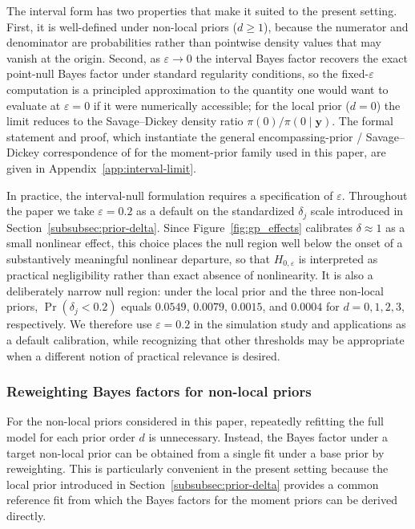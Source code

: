 \documentclass{article}
\begin{document}
The interval form has two properties that make it suited to the
present setting.
First, it is well-defined under non-local priors ($d\ge 1$),
because the numerator and denominator are probabilities rather
than pointwise density values that may vanish at the origin.
Second, as $\varepsilon\to 0$ the interval Bayes factor recovers
the exact point-null Bayes factor under standard regularity
conditions, so the fixed-$\varepsilon$ computation is a principled
approximation to the quantity one would want to evaluate at
$\varepsilon=0$ if it were numerically accessible; for the local
prior ($d=0$) the limit reduces to the Savage--Dickey density
ratio $\pi(0)/\pi(0\mid\mathbf{y})$.
The formal statement and proof, which instantiate the general
encompassing-prior / Savage--Dickey correspondence of
\textcite{wetzels2010encompassing} for the moment-prior family used
in this paper, are given in Appendix~\ref{app:interval-limit}.

In practice, the interval-null formulation requires a specification of $\varepsilon$. 
Throughout the paper we take $\varepsilon=0.2$ as a default on the standardized $\delta_j$ 
scale introduced in Section~\ref{subsubsec:prior-delta}. Since Figure~\ref{fig:gp_effects} 
calibrates $\delta \approx 1$ as a small nonlinear effect, this choice places the null 
region well below the onset of a substantively meaningful nonlinear departure, so that 
$H_{0,\varepsilon}$ is interpreted as practical negligibility rather than exact absence 
of nonlinearity. It is also a deliberately narrow null region: under the local prior and 
the three non-local priors, $\Pr(\delta_j<0.2)$ equals $0.0549$, $0.0079$, $0.0015$, 
and $0.0004$ for $d=0,1,2,3$, respectively. We therefore use $\varepsilon=0.2$ in the 
simulation study and applications as a default calibration, while recognizing that other 
thresholds may be appropriate when a different notion of practical relevance is desired.

\subsubsection{Reweighting Bayes factors for non-local priors\label{subsubsec:reweighting}}

For the non-local priors considered in this paper, repeatedly refitting the
full model for each prior order $d$ is unnecessary. Instead, the Bayes
factor under a target non-local prior can be obtained from a single fit
under a base prior by reweighting. This is particularly convenient in the
present setting because the local prior introduced in
Section~\ref{subsubsec:prior-delta} provides a common reference fit from
which the Bayes factors for the moment priors can be derived directly.
\end{document}
